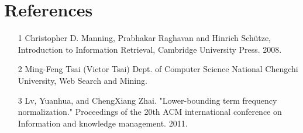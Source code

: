 \documentclass{article}
\begin{document}
\section{References}
\begin{itemize}
    \item [1] Christopher D. Manning, Prabhakar Raghavan and Hinrich Schütze, Introduction to Information Retrieval, Cambridge University Press. 2008.
    \item [2] Ming-Feng Tsai (Victor Tsai) Dept. of Computer Science National Chengchi University, Web Search and Mining.
    \item [3] Lv, Yuanhua, and ChengXiang Zhai. "Lower-bounding term frequency normalization." Proceedings of the 20th ACM international conference on Information and knowledge management. 2011.
\end{itemize}
\end{document}
